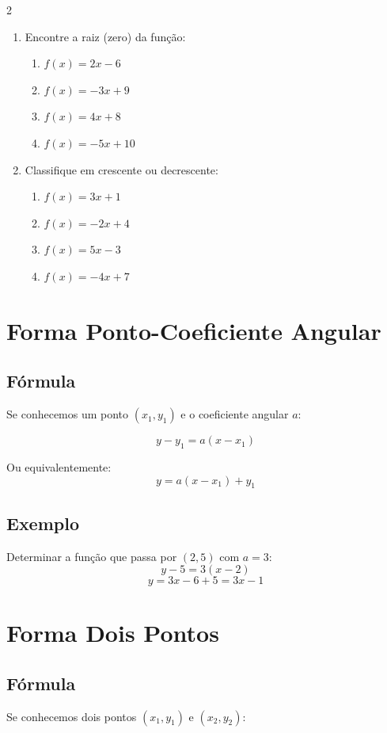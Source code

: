 \documentclass[11pt]{article}
\begin{document}
\begin{multicols}{2}
\begin{enumerate}[leftmargin=*]
\item Encontre a raiz (zero) da função:
\begin{enumerate}[label=\alph*)]
\item $f(x) = 2x - 6$
\item $f(x) = -3x + 9$
\item $f(x) = 4x + 8$
\item $f(x) = -5x + 10$
\end{enumerate}

\item Classifique em crescente ou decrescente:
\begin{enumerate}[label=\alph*)]
\item $f(x) = 3x + 1$
\item $f(x) = -2x + 4$
\item $f(x) = 5x - 3$
\item $f(x) = -4x + 7$
\end{enumerate}

\end{enumerate}

\section*{Forma Ponto-Coeficiente Angular}

\subsection*{Fórmula}
Se conhecemos um ponto $(x_1, y_1)$ e o coeficiente angular $a$:

\[
y - y_1 = a(x - x_1)
\]

Ou equivalentemente:
\[
y = a(x - x_1) + y_1
\]

\subsection*{Exemplo}
Determinar a função que passa por $(2, 5)$ com $a = 3$:
\[
y - 5 = 3(x - 2)
\]
\[
y = 3x - 6 + 5 = 3x - 1
\]

\section*{Forma Dois Pontos}

\subsection*{Fórmula}
Se conhecemos dois pontos $(x_1, y_1)$ e $(x_2, y_2)$:


\end{multicols}
\end{document}
